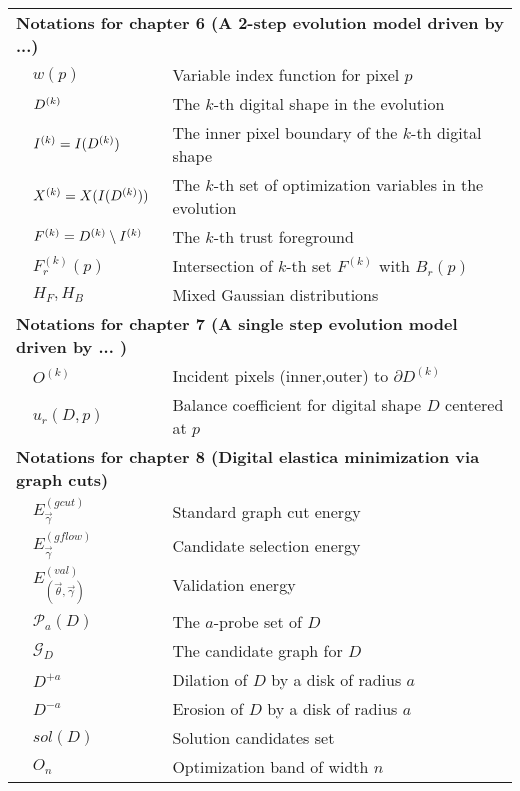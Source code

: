 {\begin{longtable}{p{0.5cm}ll}
\multicolumn{3}{l}{\textbf{Notations for chapter 6 (A 2-step evolution model driven by ...)}}\\
& $w(p)$ & Variable index function for pixel $p$\\
& $D^{(k)}$ & The $k$-th digital shape in the evolution\\
& $I^{(k)} = I(D^{(k)})$ & The inner pixel boundary of the $k$-th digital shape\\
& $X^{(k)} = X(I(D^{(k)}))$ & The $k$-th set of optimization variables in the evolution\\
& $F^{(k)} = D^{(k)} \setminus I^{(k)}$ & The $k$-th trust foreground \\
& $F_r^{(k)}(p)$ & Intersection of $k$-th set $F^{(k)}$ with $B_r(p)$\\
& $H_F,H_B$ & Mixed Gaussian distributions\\[1em]

\multicolumn{3}{l}{\textbf{Notations for chapter 7 (A single step evolution model driven by ... )}}\\
& $O^{(k)}$ & Incident pixels (inner,outer) to $\partial D^{(k)}$\\
& $u_r(D,p)$ & Balance coefficient for digital shape $D$ centered at $p$\\[1em]

\multicolumn{3}{l}{\textbf{Notations for chapter 8 (Digital elastica minimization via graph cuts)}}\\
& $E^{(gcut)}_{ \vec{\gamma} }$ & Standard graph cut energy \\
& $E^{(gflow)}_{ \vec{\gamma} }$ & Candidate selection energy \\
& $E^{(val)}_{ (\vec{\theta}, \vec{\gamma} )}$ & Validation energy \\
& $\mathcal{P}_a(D)$ & The $a$-probe set of $D$ \\
& $\mathcal{G}_D$ & The candidate graph for $D$ \\
& $D^{+a}$ & Dilation of $D$ by a disk of radius $a$ \\
& $D^{-a}$ & Erosion of $D$ by a disk of radius $a$ \\
& $sol(D)$ & Solution candidates set\\
& $O_n$ & Optimization band of width $n$\\[1em]


\end{longtable}}
